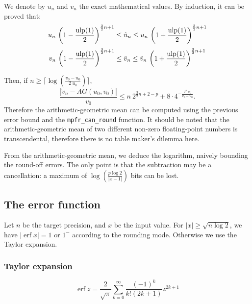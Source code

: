 \documentclass[12pt]{amsart}
\DeclareMathOperator{\erf}{erf}
\def\ulp{{\rm ulp}}
\begin{document}
We denote by $u_n$ and $v_n$ the exact mathematical values. By
induction, it can be proved that:
$$ u_n~ {\left(1-\frac{\ulp(1)}{2}\right)}^{\frac{3}{2}n+1} \leq {\tilde u_n} \leq  u_n~ {\left(1+\frac{\ulp(1)}{2}\right)}^{\frac{3}{2}n+1}$$
$$ v_n~ {\left(1-\frac{\ulp(1)}{2}\right)}^{\frac{3}{2}n+1} \leq {\tilde v_n} \leq  {\tilde v_n}~ {\left(1+\frac{\ulp(1)}{2}\right)}^{\frac{3}{2}n+1}$$

Then, if $n \ge \lceil \log \left( \frac{v_0 - u_0}{2~u_0}\right) \rceil$,
$$\frac{|{\tilde v_n} - AG(u_0,v_0)|}{v_0} \le n~2^{\frac{3}{2}n+2-p}+8 \cdot 4^{- \frac{2^n~u_0}{v_0 - u_0}}.$$
Therefore the arithmetic-geometric mean can be computed using the
previous error bound and the \verb!mpfr_can_round! function. It
should be noted that the arithmetic-geometric mean of two different
non-zero floating-point numbers is transcendental, therefore there is
no table maker's dilemma here.


From the arithmetic-geometric mean, we deduce the logarithm, naively
bounding the round-off errors. The only point is that the subtraction
may be a cancellation: a maximum of $\log \left(\frac{p \log
  2}{|x-1|}\right)$ bits can be lost.

\subsection{The error function}

Let $n$ be the target precision, and $x$ be the input value.
For $|x| \geq \sqrt{n \log 2}$, we have $|\erf x| = 1$
or $1^{-}$ according to the rounding mode.
Otherwise we use the Taylor expansion.

\subsubsection{Taylor expansion}

\[ \erf z = \frac{2}{\sqrt{\pi}} \sum_{k=0}^{\infty} \frac{(-1)^k}
        {k! (2k+1)} z^{2k+1} \]
\end{document}
